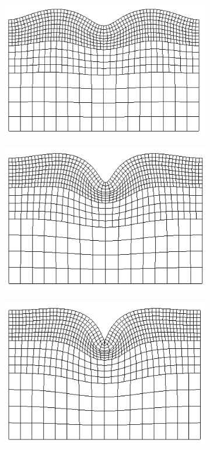 \documentclass[11pt]{report}
\begin{document}
\begin{figure}[!htb]
	\begin{subfigure}[b]{0.33\textwidth}
		\includegraphics[width=\textwidth]{mesh/mesh_piece_const_10_9_2_low}
	\end{subfigure}
	\begin{subfigure}[b]{0.33\textwidth}
		\includegraphics[width=\textwidth]{mesh/mesh_piece_const_10_9_2_med}
	\end{subfigure}
    \begin{subfigure}[b]{0.33\textwidth}
		\includegraphics[width=\textwidth]{mesh/mesh_piece_const_10_9_2_high}

\end{subfigure}
\end{figure}
\end{document}
